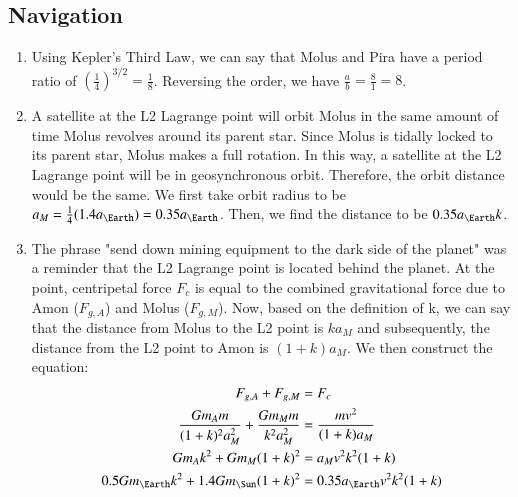 \documentclass{article}
\begin{document}
\subsection{Navigation}
\begin{enumerate}
\item Using Kepler's Third Law, we can say that Molus and Pira have a period ratio of $(\frac{1}{4})^{3/2}=\frac{1}{8}$. Reversing the order, we have $\frac{a}{b}=\frac{8}{1}=8$.
\item A satellite at the L2 Lagrange point will orbit Molus in the same amount of time Molus revolves around its parent star. Since Molus is tidally locked to its parent star, Molus makes a full rotation. In this way, a satellite at the L2 Lagrange point will be in geosynchronous orbit. Therefore, the orbit distance would be the same. We first take orbit radius to be $a_M=\frac{1}{4}(1.4a_\Earth)=0.35a_\Earth$. Then, we find the distance to be $0.35a_\Earth k$.
\item The phrase "send down mining equipment to the dark side of the planet" was a reminder that the L2 Lagrange point is located behind the planet. At the point, centripetal force $F_c$ is equal to the combined gravitational force due to Amon ($F_{g,A}$) and Molus ($F_{g,M}$). Now, based on the definition of k, we can say that the distance from Molus to the L2 point is $ka_M$ and subsequently, the distance from the L2 point to Amon is $(1+k)a_M$. We then construct the equation:
\begin{equation}
\begin{split}
F_{g,A}+F_{g,M}&=F_c\\
\frac{Gm_Am}{(1+k)^2a_M^2}+\frac{Gm_Mm}{k^2a_M^2}&=\frac{mv^2}{(1+k)a_M}\\
Gm_Ak^2+Gm_M(1+k)^2&=a_Mv^2k^2(1+k)\\
0.5Gm_\Earth k^2+1.4Gm_\Sun(1+k)^2&=0.35a_\Earth v^2k^2(1+k)
\end{split}
\end{equation}
\end{enumerate}
\end{document}
